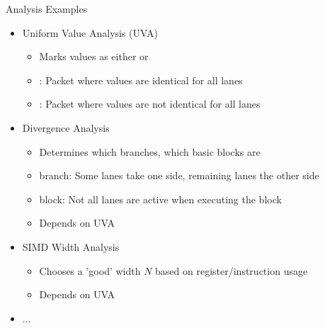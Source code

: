 \begin{frame}{Analysis Examples}

\begin{itemize}
    \item Uniform Value Analysis (UVA)
    \begin{itemize}
        \item Marks values as either  or 
        \item {}: Packet where values are identical for all lanes
        \item {}: Packet where values are not identical for all lanes
    \end{itemize}

    \item Divergence Analysis
    \begin{itemize}
        \item Determines which branches, which basic blocks are 
        \item {} branch: Some lanes take one side, remaining lanes the other side
        \item {} block: Not all lanes are active when executing the block
        \item Depends on UVA
    \end{itemize}
    
    \item SIMD Width Analysis
    \begin{itemize}
        \item Chooses a 'good' width $N$ based on register/instruction usage
        \item Depends on UVA
    \end{itemize}
    
    \item ...
\end{itemize}

\end{frame}
